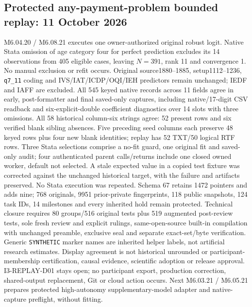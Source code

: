 \documentclass[11pt,a4paper]{article}
\begin{document}
\subsection*{Protected any-payment-problem bounded replay: 11 October 2026}
M6.04.20 / M6.08.21 executes one owner-authorized original robust logit. Native Stata omission of age category four for perfect prediction excludes its 14 observations from 405 eligible cases, leaving $N=391$, rank 11 and convergence 1. No manual exclusion or refit occurs. Original source1880--1885, setup1112--1236, \texttt{q7\_11} coding and IVS/IAT/ICDP/OQI/IEH predictors remain unchanged; IEDF and IAFF are excluded. All 545 keyed native records across 11 fields agree in early, post-formatter and final saved-only captures, including native/17-digit CSV readback and six-explicit-double coefficient diagnostics over 14 slots with three omissions.
All 58 historical column-six strings agree: 52 present rows and six verified blank sibling absences. Five preceding seed columns each preserve 48 keyed rows plus four new blank identities; replay has 52 TXT/50 logical RTF rows. Three Stata selections comprise a no-fit guard, one original fit and saved-only audit; four authenticated parent calls/returns include one closed owned worker, default not selected. A stale expected value in a copied test fixture was corrected against the unchanged historical target, with the failure and artifacts preserved. No Stata execution was repeated.
Schema 67 retains 1472 pointers and adds nine; 768 originals, 9951 prior-private fingerprints, 118 public snapshots, 124 task IDs, 14 milestones and every inherited hold remain protected. Technical closure requires 80 groups/516 original tests plus 519 augmented post-review tests, sole fresh review and explicit rulings, same-open-source built-in compilation with unchanged preamble, exclusive seal and separate exact-set/byte verification. Generic \texttt{SYNTHETIC} marker names are inherited helper labels, not artificial research estimates. Display agreement is not historical unrounded or participant-membership certification, causal evidence, scientific adoption or release approval. I3-REPLAY-D01 stays open; no participant export, production correction, shared-output replacement, Git or cloud action occurs. Next M6.03.21 / M6.05.21 prepares protected high-autonomy supplementary-model adapter and native-capture preflight, without fitting.
\end{document}
